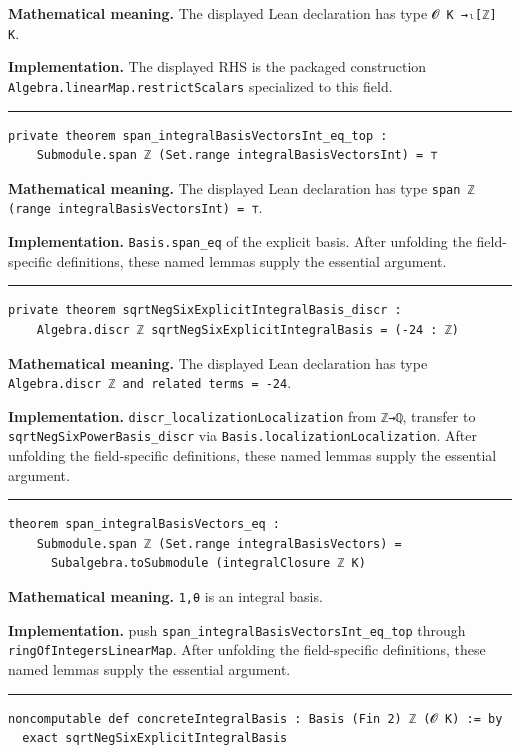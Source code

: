 \documentclass[UTF8,a4paper,11pt,fontset=fandol]{ctexart}
\theoremstyle{definition}
\newcommand{\statementsep}{\par\medskip\hrule\medskip}
\begin{document}
\noindent\textbf{Mathematical meaning.} The displayed Lean declaration has type \texttt{𝓞 K →ₗ[ℤ] K}.\par
\noindent\textbf{Implementation.} The displayed RHS is the packaged construction \texttt{Algebra.\allowbreak{}linearMap.\allowbreak{}restrictScalars} specialized to this field.\par
\statementsep
\begin{verbatim}
private theorem span_integralBasisVectorsInt_eq_top :
    Submodule.span ℤ (Set.range integralBasisVectorsInt) = ⊤
\end{verbatim}
\noindent\textbf{Mathematical meaning.} The displayed Lean declaration has type \texttt{span ℤ (range integralBasisVectorsInt) = ⊤}.\par
\noindent\textbf{Implementation.} \texttt{Basis.\allowbreak{}span\_\allowbreak{}eq} of the explicit basis. After unfolding the field-specific definitions, these named lemmas supply the essential argument.\par
\statementsep
\begin{verbatim}
private theorem sqrtNegSixExplicitIntegralBasis_discr :
    Algebra.discr ℤ sqrtNegSixExplicitIntegralBasis = (-24 : ℤ)
\end{verbatim}
\noindent\textbf{Mathematical meaning.} The displayed Lean declaration has type \texttt{Algebra.\allowbreak{}discr ℤ and related terms = -24}.\par
\noindent\textbf{Implementation.} \texttt{discr\_\allowbreak{}localizationLocalization} from \texttt{ℤ→ℚ}, transfer to \texttt{sqrtNegSixPowerBasis\_\allowbreak{}discr} via \texttt{Basis.\allowbreak{}localizationLocalization}. After unfolding the field-specific definitions, these named lemmas supply the essential argument.\par
\statementsep
\begin{verbatim}
theorem span_integralBasisVectors_eq :
    Submodule.span ℤ (Set.range integralBasisVectors) =
      Subalgebra.toSubmodule (integralClosure ℤ K)
\end{verbatim}
\noindent\textbf{Mathematical meaning.} \texttt{1,θ} is an integral basis.\par
\noindent\textbf{Implementation.} push \texttt{span\_\allowbreak{}integralBasisVectorsInt\_\allowbreak{}eq\_\allowbreak{}top} through \texttt{ringOfIntegersLinearMap}. After unfolding the field-specific definitions, these named lemmas supply the essential argument.\par
\statementsep
\begin{verbatim}
noncomputable def concreteIntegralBasis : Basis (Fin 2) ℤ (𝓞 K) := by
  exact sqrtNegSixExplicitIntegralBasis
\end{verbatim}
\end{document}
